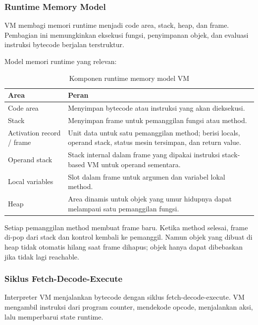 \subsubsection{Runtime Memory Model}

\begin{jawab}
VM membagi memori runtime menjadi code area, stack, heap, dan frame. Pembagian ini memungkinkan eksekusi fungsi, penyimpanan objek, dan evaluasi instruksi bytecode berjalan terstruktur.
\end{jawab}

Model memori runtime yang relevan:

\begin{table}[H]
\centering
\begin{tabularx}{\textwidth}{|L{0.24\textwidth}|X|}
\hline
\textbf{Area} & \textbf{Peran} \\
\hline
Code area & Menyimpan bytecode atau instruksi yang akan dieksekusi. \\
\hline
Stack & Menyimpan frame untuk pemanggilan fungsi atau method. \\
\hline
Activation record / frame & Unit data untuk satu pemanggilan method; berisi locals, operand stack, status mesin tersimpan, dan return value. \\
\hline
Operand stack & Stack internal dalam frame yang dipakai instruksi stack-based VM untuk operand sementara. \\
\hline
Local variables & Slot dalam frame untuk argumen dan variabel lokal method. \\
\hline
Heap & Area dinamis untuk objek yang umur hidupnya dapat melampaui satu pemanggilan fungsi. \\
\hline
\end{tabularx}
\caption{Komponen runtime memory model VM}
\label{tab:runtime-memory-vm}
\end{table}

Setiap pemanggilan method membuat frame baru. Ketika method selesai, frame di-pop dari stack dan kontrol kembali ke pemanggil. Namun objek yang dibuat di heap tidak otomatis hilang saat frame dihapus; objek hanya dapat dibebaskan jika tidak lagi reachable.

\subsubsection{Siklus Fetch-Decode-Execute}

\begin{jawab}
Interpreter VM menjalankan bytecode dengan siklus fetch-decode-execute. VM mengambil instruksi dari program counter, mendekode opcode, menjalankan aksi, lalu memperbarui state runtime.
\end{jawab}

